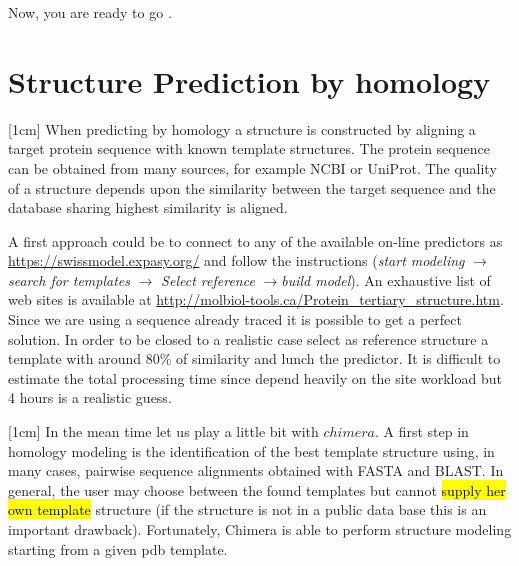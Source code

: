 \documentclass[12pt]{article} %
\begin{document}
Now, you are ready to go \Smiley{}.


\section{Structure Prediction by homology}
[1cm]
When predicting by homology a structure is constructed by aligning a target protein sequence with known template structures. The protein sequence can be obtained from many sources, for example NCBI or UniProt. The quality of a structure depends upon the similarity between the target sequence and the database sharing highest similarity is aligned. 

A first approach could be to connect to any of the available on-line predictors as \url{https://swissmodel.expasy.org/} and follow the instructions (\textit{start modeling} $\rightarrow$  \textit{search for templates} $\rightarrow$ \textit{Select reference} $\rightarrow$\textit{build model}). An exhaustive list of web sites is available at \url{http://molbiol-tools.ca/Protein_tertiary_structure.htm}. Since we are  using a sequence already traced it is possible to get a perfect solution. In order to be closed to a realistic case select as reference structure a template with around 80\% of similarity and lunch the predictor. It is difficult to  estimate the total processing time since depend heavily on the site workload but 4 hours is a realistic guess. 

[1cm]
In the mean time let us play a little bit with $chimera$. A first step in homology modeling is the identification of the best template structure using, in many cases,  pairwise sequence alignments obtained with FASTA and BLAST. In general, the user may choose between the found templates but cannot \hl{supply her own template} structure (if the structure is not in a public data base this is an important drawback). Fortunately, Chimera is able to perform structure modeling starting from a given pdb template.
\end{document}
